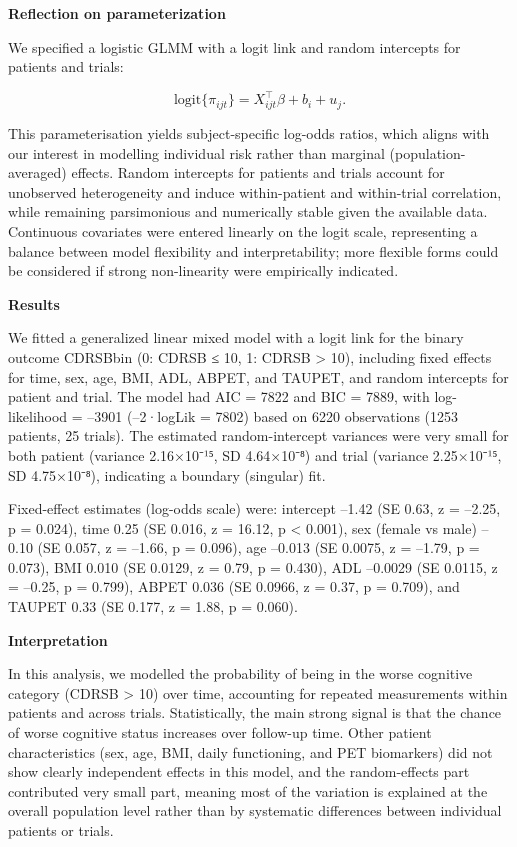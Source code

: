 \documentclass[
  11pt,
  letterpaper,
  DIV=11,
  numbers=noendperiod]{scrartcl}
\begin{document}
\textbf{Reflection on parameterization}

We specified a logistic GLMM with a logit link and random intercepts for
patients and trials:

\[
\text{logit}\{\pi_{ijt}\} = X_{ijt}^\top \beta + b_i + u_j.
\]

This parameterisation yields subject-specific log-odds ratios, which
aligns with our interest in modelling individual risk rather than
marginal (population-averaged) effects. Random intercepts for patients
and trials account for unobserved heterogeneity and induce
within-patient and within-trial correlation, while remaining
parsimonious and numerically stable given the available data. Continuous
covariates were entered linearly on the logit scale, representing a
balance between model flexibility and interpretability; more flexible
forms could be considered if strong non-linearity were empirically
indicated.

\textbf{Results}

We fitted a generalized linear mixed model with a logit link for the
binary outcome CDRSBbin (0: CDRSB ≤ 10, 1: CDRSB \textgreater{} 10),
including fixed effects for time, sex, age, BMI, ADL, ABPET, and TAUPET,
and random intercepts for patient and trial. The model had AIC = 7822
and BIC = 7889, with log-likelihood = --3901 (--2·logLik = 7802) based
on 6220 observations (1253 patients, 25 trials). The estimated
random-intercept variances were very small for both patient (variance
2.16×10⁻¹⁵, SD 4.64×10⁻⁸) and trial (variance 2.25×10⁻¹⁵, SD 4.75×10⁻⁸),
indicating a boundary (singular) fit.

Fixed-effect estimates (log-odds scale) were: intercept --1.42 (SE 0.63,
z = --2.25, p = 0.024), time 0.25 (SE 0.016, z = 16.12, p \textless{}
0.001), sex (female vs male) --0.10 (SE 0.057, z = --1.66, p = 0.096),
age --0.013 (SE 0.0075, z = --1.79, p = 0.073), BMI 0.010 (SE 0.0129, z
= 0.79, p = 0.430), ADL --0.0029 (SE 0.0115, z = --0.25, p = 0.799),
ABPET 0.036 (SE 0.0966, z = 0.37, p = 0.709), and TAUPET 0.33 (SE 0.177,
z = 1.88, p = 0.060).

\textbf{Interpretation}

In this analysis, we modelled the probability of being in the worse
cognitive category (CDRSB \textgreater{} 10) over time, accounting for
repeated measurements within patients and across trials. Statistically,
the main strong signal is that the chance of worse cognitive status
increases over follow-up time. Other patient characteristics (sex, age,
BMI, daily functioning, and PET biomarkers) did not show clearly
independent effects in this model, and the random-effects part
contributed very small part, meaning most of the variation is explained
at the overall population level rather than by systematic differences
between individual patients or trials.
\end{document}
